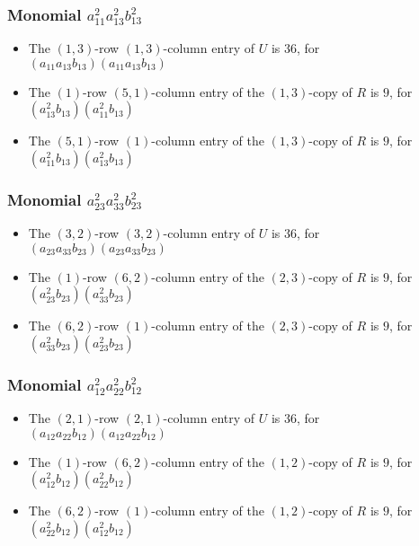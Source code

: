\documentclass{article}
\begin{document}
\subsubsection{Monomial $ a_{11}^{2} a_{13}^{2} b_{13}^{2} $}

\begin{itemize}
\item The $ \left(1, 3\right) $-row $ \left(1, 3\right) $-column entry of $U$ is $ 36 $, for $( a_{11} a_{13} b_{13} )( a_{11} a_{13} b_{13} )$ 
\item The $(1)$-row $(5, 1)$-column entry of the $ \left(1, 3\right) $-copy of $R$ is $ 9 $, for $( a_{13}^{2} b_{13} )( a_{11}^{2} b_{13} )$ 
\item The $(5, 1)$-row $(1)$-column entry of the $ \left(1, 3\right) $-copy of $R$ is $ 9 $, for $( a_{11}^{2} b_{13} )( a_{13}^{2} b_{13} )$ 
\end{itemize}
\subsubsection{Monomial $ a_{23}^{2} a_{33}^{2} b_{23}^{2} $}

\begin{itemize}
\item The $ \left(3, 2\right) $-row $ \left(3, 2\right) $-column entry of $U$ is $ 36 $, for $( a_{23} a_{33} b_{23} )( a_{23} a_{33} b_{23} )$ 
\item The $(1)$-row $(6, 2)$-column entry of the $ \left(2, 3\right) $-copy of $R$ is $ 9 $, for $( a_{23}^{2} b_{23} )( a_{33}^{2} b_{23} )$ 
\item The $(6, 2)$-row $(1)$-column entry of the $ \left(2, 3\right) $-copy of $R$ is $ 9 $, for $( a_{33}^{2} b_{23} )( a_{23}^{2} b_{23} )$ 
\end{itemize}
\subsubsection{Monomial $ a_{12}^{2} a_{22}^{2} b_{12}^{2} $}

\begin{itemize}
\item The $ \left(2, 1\right) $-row $ \left(2, 1\right) $-column entry of $U$ is $ 36 $, for $( a_{12} a_{22} b_{12} )( a_{12} a_{22} b_{12} )$ 
\item The $(1)$-row $(6, 2)$-column entry of the $ \left(1, 2\right) $-copy of $R$ is $ 9 $, for $( a_{12}^{2} b_{12} )( a_{22}^{2} b_{12} )$ 
\item The $(6, 2)$-row $(1)$-column entry of the $ \left(1, 2\right) $-copy of $R$ is $ 9 $, for $( a_{22}^{2} b_{12} )( a_{12}^{2} b_{12} )$ 
\end{itemize}
\end{document}
